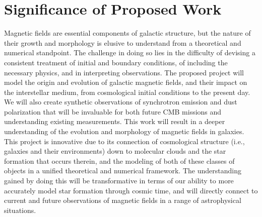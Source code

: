 \vspace{-4mm}
\section{Significance of Proposed Work}
\vspace{-3mm}

Magnetic fields are essential components of galactic structure, but
the nature of their growth and morphology is elusive to understand
from a theoretical and numerical standpoint.  The challenge in doing
so lies in the difficulty of devising a consistent treatment of
initial and boundary conditions, of including the necessary physics,
and in interpreting observations.  The proposed project will model the
origin and evolution of galactic magnetic fields, and their impact on
the interstellar medium, from cosmological initial conditions to
the present day.  We will also create synthetic observations 
of synchrotron emission and dust polarization that will be invaluable for both future
CMB missions  and understanding existing measurements.
This work will
result in a deeper understanding of the evolution and morphology of magnetic
fields in galaxies.
This project is innovative due to its connection of
cosmological structure (i.e., galaxies and their environments) down to
molecular clouds and the star formation that occurs therein, and the
modeling of both of these classes of objects in a unified theoretical
and numerical framework.  
The understanding gained by doing this will
be transformative in terms of our ability to more accurately model
star formation through cosmic time, and will directly connect to
current and future observations of magnetic fields in a range of
astrophysical situations.
